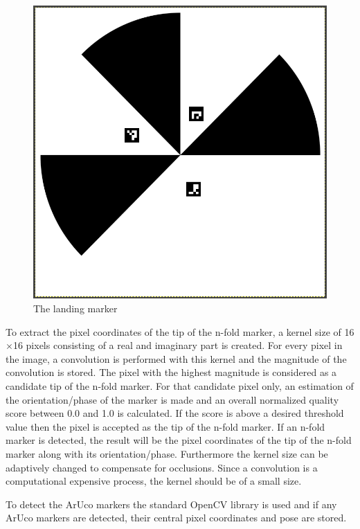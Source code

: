 \documentclass[conference]{IEEEtran}
\begin{document}
\begin{figure}[h]
\centering
\includegraphics[scale=0.15]{n-fold-for-landing.png}
\caption{The landing marker}
\label{fig:LandingMarker}
\end{figure}

To extract the pixel coordinates of the tip of the n-fold marker, a kernel size of 16$\times$16 pixels consisting of a real and imaginary part is created. For every pixel in the image, a convolution is performed with this kernel and the magnitude of the convolution is stored. The pixel with the highest magnitude is considered as a candidate tip of the n-fold marker. For that candidate pixel only, an estimation of the orientation/phase of the marker is made and an overall normalized quality score between 0.0 and 1.0 is calculated. If the score is above a desired threshold value then the pixel is accepted as the tip of the n-fold marker. If an n-fold marker is detected, the result will be the pixel coordinates of the tip of the n-fold marker along with its orientation/phase. Furthermore the kernel size can be adaptively changed to compensate for occlusions. Since a convolution is a computational  expensive process, the kernel should be of a small size.

To detect the ArUco markers the standard OpenCV library is used and if any ArUco markers are detected, their central pixel coordinates and pose are stored.
\end{document}
